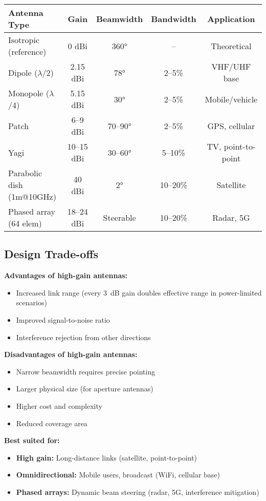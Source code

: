 \begin{center}
\begin{tabular}{@{}lcccc@{}}
\toprule
\textbf{Antenna Type} & \textbf{Gain} & \textbf{Beamwidth} & \textbf{Bandwidth} & \textbf{Application} \\
\midrule
Isotropic (reference) & 0 dBi & 360$°$ & -- & Theoretical \\
Dipole ($\lambda$/2) & 2.15 dBi & 78$°$ & 2--5\% & VHF/UHF base \\
Monopole ($\lambda$/4) & 5.15 dBi & 30$°$ & 2--5\% & Mobile/vehicle \\
Patch & 6--9 dBi & 70--90$°$ & 2--5\% & GPS, cellular \\
Yagi & 10--15 dBi & 30--60$°$ & 5--10\% & TV, point-to-point \\
Parabolic dish (1m@10GHz) & 40 dBi & 2$°$ & 10--20\% & Satellite \\
Phased array (64 elem) & 18--24 dBi & Steerable & 10--20\% & Radar, 5G \\
\bottomrule
\end{tabular}
\end{center}

\subsection{Design Trade-offs}

\textbf{Advantages of high-gain antennas:}
\begin{itemize}
\item Increased link range (every 3~dB gain doubles effective range in power-limited scenarios)
\item Improved signal-to-noise ratio
\item Interference rejection from other directions
\end{itemize}

\textbf{Disadvantages of high-gain antennas:}
\begin{itemize}
\item Narrow beamwidth requires precise pointing
\item Larger physical size (for aperture antennas)
\item Higher cost and complexity
\item Reduced coverage area
\end{itemize}

\textbf{Best suited for:}
\begin{itemize}
\item \textbf{High gain:} Long-distance links (satellite, point-to-point)
\item \textbf{Omnidirectional:} Mobile users, broadcast (WiFi, cellular base)
\item \textbf{Phased arrays:} Dynamic beam steering (radar, 5G, interference mitigation)
\end{itemize}

